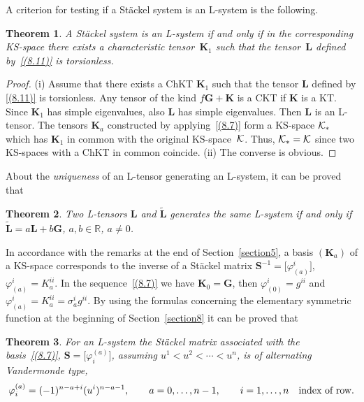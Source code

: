 \documentclass[pdftex]{sigma}
\def\bs{\boldsymbol}
\numberwithin{equation}{section}
\newtheorem{Theorem}{Theorem}[section]
 { \theoremstyle{definition}
\newtheorem{Notation}[Theorem]{Notation}
\newtheorem{Example}[Theorem]{Example}
\newtheorem{Remark}[Theorem]{Remark}
\newtheorem{Remarks}[Theorem]{Remarks}
 }
\begin{document}
     A criterion for testing if a St\"ackel system is an L-system is the following.

\begin{Theorem}
A St\"ackel system is an L-system if and only if in the corresponding KS-space there exists a characteristic tensor~$\bs K_1$ such that the tensor~$\bs L$ defined by~\eqref{(8.11)} is torsionless.
\end{Theorem}

\begin{proof}
(i) Assume that there exists a ChKT $\bs K_1$ such that the tensor $\bs L$ def\/ined by \eqref{(8.11)} is torsionless. Any tensor of the kind $f\bs G+\bs K$ is a CKT if $\bs K$ is a KT. Since $\bs K_1$ has simple eigenvalues, also $\bs L$ has simple eigenvalues. Then $\bs L$ is an L-tensor. The tensors $\bs K_a$ constructed by applying~\eqref{(8.7)} form a KS-space $\cal K_*$ which has $\bs K_1$ in common with the original KS-space~$\cal K$.  Thus, $\cal K_*=\cal K$ since two KS-spaces with a ChKT in common coincide. (ii) The converse is obvious.
\end{proof}

About the {\it uniqueness} of an L-tensor generating an L-system, it can be proved that

\begin{Theorem}
Two L-tensors $\bs L$ and $\tilde{\bs L}$ generates the same L-system if and only if $\tilde{\bs L}=a\bs L+b\bs G$, $a,b\in\mathbb R$, $a\neq 0$.
\end{Theorem}

In accordance with the remarks at the end of Section~\ref{section5}, a basis
$(\bs K_a)$ of a KS-space corresponds to the inverse of a St\"ackel matrix
$\bs S^{-1}=\big[\varphi_{(a)}^i\big]$, $\varphi_{(a)}^i=K_a^{ii}$.
In the sequence~\eqref{(8.7)} we have \mbox{$\bs K_0=\bs G$}, then $\varphi_{(0)}^i=g^{ii}$ and $\varphi_{(a)}^i=K_a^{ii}=\sigma_a^ig^{ii}$.
By using the formulas concerning the elementary symmetric function at the beginning of Section~\ref{section8} it can be proved that

\begin{Theorem}
For an L-system the St\"ackel matrix associated with the basis~\eqref{(8.7)}, $\bs S=\big[\varphi_i^{(a)} \big]$, assuming $u^1<u^2<\cdots<u^n$, is of  alternating Vandermonde type,
\begin{gather}
\varphi_i^{(a)}=(-1)^{n-a+i}  (u^i)^{n-a-1}, \qquad
a=0,\ldots,n-1,\qquad
i=1,\ldots,n\quad \hbox{\rm index of row.}
\label{(8.12)}
\end{gather}
\end{Theorem}
\end{document}
